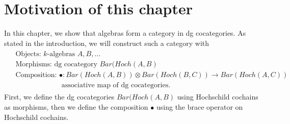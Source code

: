\section{Motivation of this chapter}
In this chapter, we show that algebras 
form a category in dg cocategories. 
As stated in the introduction, we will 
construct such a category with 
\begin{align}
\begin{split}
	&\textrm{Objects: $k$-algebras } A,B,\dots\\
	&\textrm{Morphisms: dg cocategory } Bar(Hoch(A,B)\\
	&\textrm{Composition: } \bullet: Bar(Hoch(A,B)) \otimes 
	Bar(Hoch(B,C)) \to Bar(Hoch(A,C))\\
	&\phantom{Composition: }
	\textrm{ associative map of dg cocategories.}
\end{split}
\end{align}
First, we define the dg cocategories 
$Bar(Hoch(A,B)$ using Hochschild cochains 
as morphisms, then we define the composition 
$\bullet$ using the brace operator on 
Hochschild cochains.